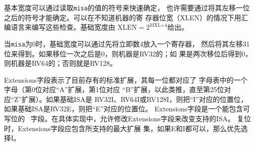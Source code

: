 \iffalse
\begin{commentary}
The base width can be quickly ascertained using branches on the sign
of the returned {\tt misa} value, and possibly a shift left by one and
a second branch on the sign.  These checks can be written in assembly
code without knowing the register width (XLEN) of the machine.  The
base width is given by $\mbox{XLEN}=2^{\mbox{MXL+4}}$.

The base width can also be found if {\tt misa} is zero, by placing the
immediate 4 in a register then shifting the register left by 31 bits
at a time.  If zero after one shift, then the machine is RV32.  If
zero after two shifts, then the machine is RV64, else RV128.
\end{commentary}
\fi

\begin{commentary}
基本宽度可以通过读取{\tt misa}的值的符号来快速确定，
也许需要通过将其左移一位之后的符号才能确定。可以在不知道机器的寄
存器位宽（XLEN）的情况下用汇编语言来编写这些检查。基础宽度由
$\mbox{XLEN}=2^{\mbox{MXL+4}}$给出。

当{\tt misa}为0时，基础宽度可以通过先将立即数4放入一个寄存器，
然后将其左移31位来得到。如果移位一次之后是0，则机器是RV32的；如
果是两次移位后得到0，则机器是RV64的；否则就是RV128。
\end{commentary}

\iffalse
The Extensions field encodes the presence of the standard extensions,
with a single bit per letter of the alphabet (bit 0 encodes presence
of extension ``A'' , bit 1 encodes presence of extension ``B'',
through to bit 25 which encodes ``Z'').  The ``I'' bit will be set for
RV32I, RV64I, RV128I base ISAs, and the ``E'' bit will be set for
RV32E.  The Extensions field is a \warl\ field that can contain writable bits
where the implementation allows the supported ISA to be modified.  At
reset, the Extensions field shall contain the maximal set of supported
extensions, and I shall be selected over E if both are available.
\fi

Extensions字段表示了目前存有的标准扩展，其每一位都对应了
字母表中的一个字母（第0位对应``A''扩展，第1位对应
``B''扩展，以此类推，直至第25位对应``Z''扩展）。如果基础ISA是
RV32I、RV64I或RV128I，则把``I''对应的位置位，如果基础ISA是RV32E，则把``E''对应的位置位。
Extensions字段是一个能包含可写位的 \warl\ 字段。在具体实现中，允许修改Extensions字段来改变支持的ISA。
复位时，Extensions字段应包含所支持的最大扩展
集，如果E和I都可以，那么优先选择I。

\iffalse
When a standard extension is disabled by clearing its bit in {\tt misa}, the instructions and CSRs defined or modified by the extension revert to their defined or reserved behaviors as if the extension is not implemented.
\fi

